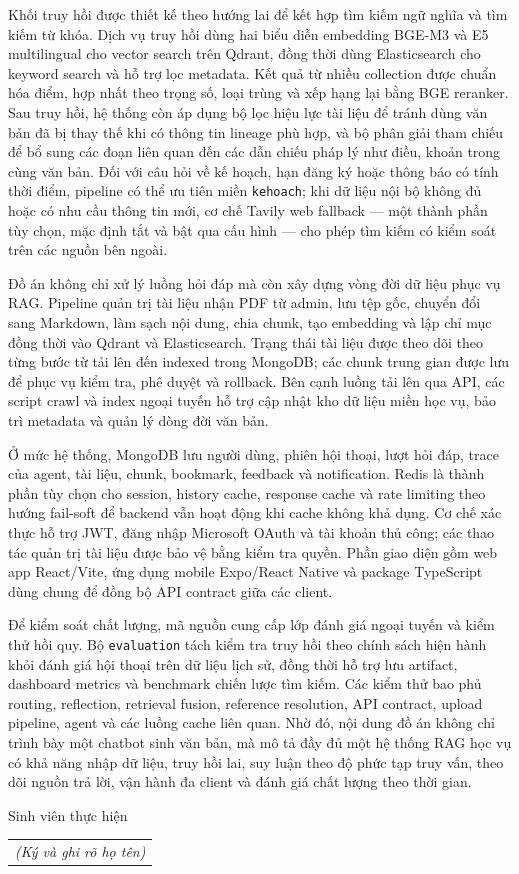 \documentclass[../DoAn.tex]{subfiles}
\begin{document}
Khối truy hồi được thiết kế theo hướng lai để kết hợp tìm kiếm ngữ nghĩa và tìm
kiếm từ khóa. Dịch vụ truy hồi dùng hai biểu diễn embedding BGE-M3 và E5
multilingual cho vector search trên Qdrant, đồng thời dùng Elasticsearch cho
keyword search và hỗ trợ lọc metadata. Kết quả từ nhiều collection được chuẩn
hóa điểm, hợp nhất theo trọng số, loại trùng và xếp hạng lại bằng BGE reranker.
Sau truy hồi, hệ thống còn áp dụng bộ lọc hiệu lực tài liệu để tránh dùng văn
bản đã bị thay thế khi có thông tin lineage phù hợp, và bộ phân giải tham chiếu
để bổ sung các đoạn liên quan đến các dẫn chiếu pháp lý như điều, khoản trong
cùng văn bản. Đối với câu hỏi về kế hoạch, hạn đăng ký hoặc thông báo có tính
thời điểm, pipeline có thể ưu tiên miền \texttt{kehoach}; khi dữ liệu nội bộ
không đủ hoặc có nhu cầu thông tin mới, cơ chế Tavily web fallback — một thành
phần tùy chọn, mặc định tắt và bật qua cấu hình — cho phép tìm kiếm có kiểm soát
trên các nguồn bên ngoài.

Đồ án không chỉ xử lý luồng hỏi đáp mà còn xây dựng vòng đời dữ liệu phục vụ RAG.
Pipeline quản trị tài liệu nhận PDF từ admin, lưu tệp gốc, chuyển đổi sang
Markdown, làm sạch nội dung, chia chunk, tạo embedding và lập chỉ mục đồng thời
vào Qdrant và Elasticsearch. Trạng thái tài liệu được theo dõi theo từng bước
từ tải lên đến indexed trong MongoDB; các chunk trung gian được lưu để phục vụ
kiểm tra, phê duyệt và rollback. Bên cạnh luồng tải lên qua API, các script crawl
và index ngoại tuyến hỗ trợ cập nhật kho dữ liệu miền học vụ, bảo trì metadata và
quản lý dòng đời văn bản.

Ở mức hệ thống, MongoDB lưu người dùng, phiên hội thoại, lượt hỏi đáp, trace của
agent, tài liệu, chunk, bookmark, feedback và notification. Redis là thành phần
tùy chọn cho session, history cache, response cache và rate limiting theo hướng
fail-soft để backend vẫn hoạt động khi cache không khả dụng. Cơ chế xác thực hỗ
trợ JWT, đăng nhập Microsoft OAuth và tài khoản thủ công; các thao tác quản trị
tài liệu được bảo vệ bằng kiểm tra quyền. Phần giao diện gồm web app React/Vite,
ứng dụng mobile Expo/React Native và package TypeScript dùng chung để đồng bộ
API contract giữa các client.

Để kiểm soát chất lượng, mã nguồn cung cấp lớp đánh giá ngoại tuyến và kiểm thử
hồi quy. Bộ \texttt{evaluation} tách kiểm tra truy hồi theo chính sách hiện hành
khỏi đánh giá hội thoại trên dữ liệu lịch sử, đồng thời hỗ trợ lưu artifact,
dashboard metrics và benchmark chiến lược tìm kiếm. Các kiểm thử bao phủ routing,
reflection, retrieval fusion, reference resolution, API contract, upload
pipeline, agent và các luồng cache liên quan. Nhờ đó, nội dung đồ án không chỉ
trình bày một chatbot sinh văn bản, mà mô tả đầy đủ một hệ thống RAG học vụ có
khả năng nhập dữ liệu, truy hồi lai, suy luận theo độ phức tạp truy vấn, theo dõi
nguồn trả lời, vận hành đa client và đánh giá chất lượng theo thời gian.

\begin{flushright}
Sinh viên thực hiện\\
\begin{tabular}{@{}c@{}}
\textit{(Ký và ghi rõ họ tên)}
\end{tabular}
\end{flushright}
\end{document}
